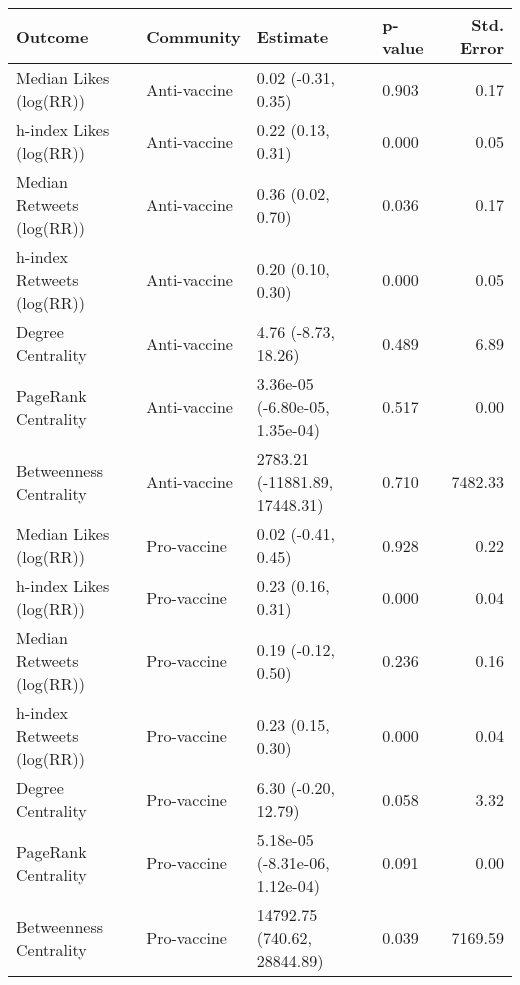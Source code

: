\begin{table}[ht]
\centering
\begin{tabular}{llllr}
  \hline
Outcome & Community & Estimate & p-value & Std. Error \\ 
  \hline
Median Likes (log(RR)) & Anti-vaccine & 0.02 (-0.31, 0.35) & 0.903 & 0.17 \\ 
  h-index Likes (log(RR)) & Anti-vaccine & 0.22 (0.13, 0.31) & 0.000 & 0.05 \\ 
  Median Retweets (log(RR)) & Anti-vaccine & 0.36 (0.02, 0.70) & 0.036 & 0.17 \\ 
  h-index Retweets (log(RR)) & Anti-vaccine & 0.20 (0.10, 0.30) & 0.000 & 0.05 \\ 
  Degree Centrality & Anti-vaccine & 4.76 (-8.73, 18.26) & 0.489 & 6.89 \\ 
  PageRank Centrality & Anti-vaccine & 3.36e-05 (-6.80e-05, 1.35e-04) & 0.517 & 0.00 \\ 
  Betweenness Centrality & Anti-vaccine & 2783.21 (-11881.89, 17448.31) & 0.710 & 7482.33 \\ 
  Median Likes (log(RR)) & Pro-vaccine & 0.02 (-0.41, 0.45) & 0.928 & 0.22 \\ 
  h-index Likes (log(RR)) & Pro-vaccine & 0.23 (0.16, 0.31) & 0.000 & 0.04 \\ 
  Median Retweets (log(RR)) & Pro-vaccine & 0.19 (-0.12, 0.50) & 0.236 & 0.16 \\ 
  h-index Retweets (log(RR)) & Pro-vaccine & 0.23 (0.15, 0.30) & 0.000 & 0.04 \\ 
  Degree Centrality & Pro-vaccine & 6.30 (-0.20, 12.79) & 0.058 & 3.32 \\ 
  PageRank Centrality & Pro-vaccine & 5.18e-05 (-8.31e-06, 1.12e-04) & 0.091 & 0.00 \\ 
  Betweenness Centrality & Pro-vaccine & 14792.75 (740.62, 28844.89) & 0.039 & 7169.59 \\ 
   \hline
\end{tabular}
\end{table}
